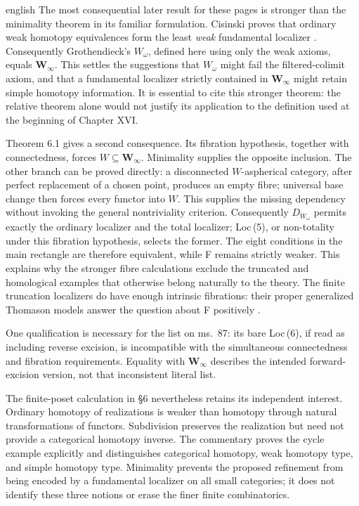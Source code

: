 \begin{otherlanguage*}{english}
The most consequential later result for these pages is stronger than the minimality theorem in its familiar formulation. Cisinski proves that ordinary weak homotopy equivalences form the least \emph{weak} fundamental localizer \citep[Theorem 6.1.18, pp.~242--243]{Cisinski2006}. Consequently Grothendieck's $W_\omega$, defined here using only the weak axioms, equals $\mathbf W_\infty$. This settles the suggestions that $W_\omega$ might fail the filtered-colimit axiom, and that a fundamental localizer strictly contained in $\mathbf W_\infty$ might retain simple homotopy information. It is essential to cite this stronger theorem: the relative theorem alone would not justify its application to the definition used at the beginning of Chapter XVI.

Theorem 6.1 gives a second consequence. Its fibration hypothesis, together with connectedness, forces $W\subseteq\mathbf W_\infty$. Minimality supplies the opposite inclusion. The other branch can be proved directly: a disconnected $W$-aspherical category, after perfect replacement of a chosen point, produces an empty fibre; universal base change then forces every functor into $W$. This supplies the missing dependency without invoking the general nontriviality criterion. Consequently $D_{W_\omega}$ permits exactly the ordinary localizer and the total localizer; Loc\,(5), or non-totality under this fibration hypothesis, selects the former. The eight conditions in the main rectangle are therefore equivalent, while F remains strictly weaker. This explains why the stronger fibre calculations exclude the truncated and homological examples that otherwise belong naturally to the theory. The finite truncation localizers do have enough intrinsic fibrations: their proper generalized Thomason models answer the question about F positively \citep[\S9.2.1, Corollary 9.2.15 and Theorem 5.2.15]{Cisinski2006}.

One qualification is necessary for the list on ms.~87: its bare Loc\,(6), if read as including reverse excision, is incompatible with the simultaneous connectedness and fibration requirements. Equality with $\mathbf W_\infty$ describes the intended forward-excision version, not that inconsistent literal list.

The finite-poset calculation in \S6 nevertheless retains its independent interest. Ordinary homotopy of realizations is weaker than homotopy through natural transformations of functors. Subdivision preserves the realization but need not provide a categorical homotopy inverse. The commentary proves the cycle example explicitly and distinguishes categorical homotopy, weak homotopy type, and simple homotopy type. Minimality prevents the proposed refinement from being encoded by a fundamental localizer on all small categories; it does not identify these three notions or erase the finer finite combinatorics.


\end{otherlanguage*}
